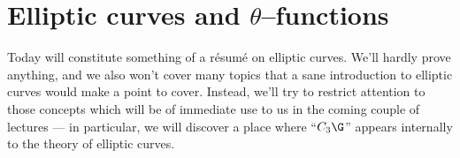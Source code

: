 









\section{Elliptic curves and \texorpdfstring{$\theta$}{theta}--functions}\label{SectionEllipticCurvesAndThetaFunctions}


Today will constitute something of a r\'esum\'e on elliptic curves.  We'll hardly prove anything, and we also won't cover many topics that a sane introduction to elliptic curves would make a point to cover.  Instead, we'll try to restrict attention to those concepts which will be of immediate use to us in the coming couple of lectures --- in particular, we will discover a place where ``$C_3 \G$'' appears internally to the theory of elliptic curves.

